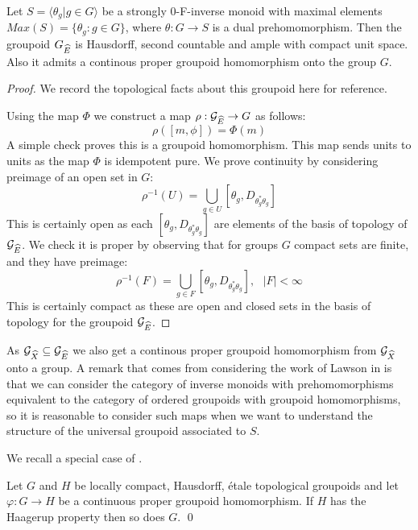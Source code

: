 \begin{proposition}\label{Prop:GrpoidHom}
Let $S = \langle \theta_{g} | g \in G \rangle$ be a strongly 0-F-inverse monoid with maximal elements $Max(S)= \lbrace \theta_{g}:g \in G \rbrace$, where $\theta: G \rightarrow S$ is a dual prehomomorphism. Then the groupoid $G_{\widehat{E}}$ is Hausdorff, second countable and ample with compact unit space. Also it admits a continous proper groupoid homomorphism onto the group $G$.
\end{proposition}
\begin{proof}
We record the topological facts about this groupoid here for reference.

Using the map $\Phi$ we construct a map $\rho: \mathcal{G}_{\widehat{E}} \rightarrow G$ as follows:
\begin{equation*}
\rho([m,\phi]) = \Phi(m)
\end{equation*}
A simple check proves this is a groupoid homomorphism. This map sends units to units as the map $\Phi$ is idempotent pure. We prove continuity by considering preimage of an open set in $G$:
\begin{equation*}
\rho^{-1}(U)=\bigcup_{g \in U}[\theta_{g},D_{\theta^{*}_{g}\theta_{g}}]
\end{equation*}
This is certainly open as each $[\theta_{g},D_{\theta^{*}_{g}\theta_{g}}]$ are elements of the basis of topology of $\mathcal{G}_{\widehat{E}}$. We check it is proper by observing that for groups $G$ compact sets are finite, and they have preimage:
\begin{equation*}
\rho^{-1}(F)=\bigcup_{g \in F}[\theta_{g},D_{\theta^{*}_{g}\theta_{g}}], \mbox{ } \vert F \vert < \infty 
\end{equation*}
This is certainly compact as these are open and closed sets in the basis of topology for the groupoid $\mathcal{G}_{\widehat{E}}$.\end{proof}

As $\mathcal{G}_{\widehat{X}} \subseteq \mathcal{G}_{\widehat{E}}$ we also get a continous proper groupoid homomorphism from $\mathcal{G}_{\widehat{X}}$ onto a group.  A remark that comes from considering the work of Lawson in \cite{MR1694900} is that we can consider the category of inverse monoids with prehomomorphisms equivalent to the category of ordered groupoids with groupoid homomorphisms, so it is reasonable to consider such maps when we want to understand the structure of the universal groupoid associated to $S$. 

We recall a special case of \cite[Lemme 3.12]{MR1703305}.

\begin{lemma}\label{Lem:Lemme}
Let $G$ and $H$ be locally compact, Hausdorff, \'etale topological groupoids and let $\varphi: G \rightarrow H$ be a continuous proper groupoid homomorphism. If $H$ has the Haagerup property then so does $G$. \qed
\end{lemma}

